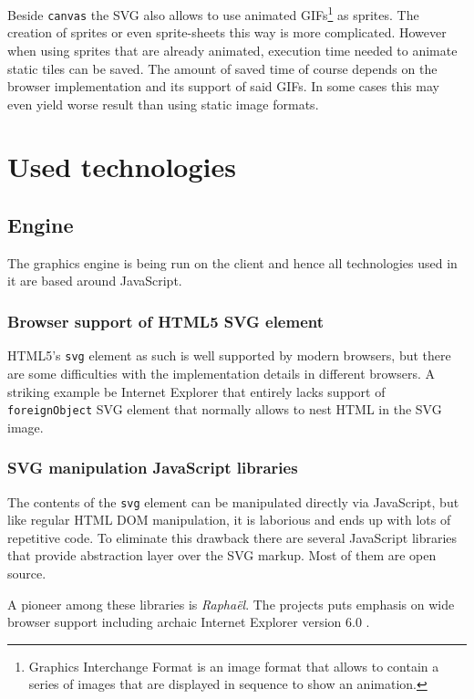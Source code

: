 \documentclass[11pt,oneside, final]{fithesis2}
\begin{document}
Beside \texttt{canvas} the SVG also allows to use animated GIFs\footnote{Graphics Interchange Format is an image format that allows to contain a series of images that are displayed in sequence to show an animation\cite{gifstandard}.} as sprites. The creation of sprites or even sprite-sheets this way is more complicated. However when using sprites that are already animated, execution time needed to animate static tiles can be saved. The amount of saved time of course depends on the browser implementation and its support of said GIFs. In some cases this may even yield worse result than using static image formats.

\chapter{Used technologies}
\label{tech}

\section{Engine}
The graphics engine is being run on the client and hence all technologies used in it are based around JavaScript.

\subsection{Browser support of HTML5 SVG element}
HTML5's \texttt{svg} element as such is well supported by modern browsers\cite{html5svg}, but there are some difficulties with the implementation details in different browsers. A striking example be Internet Explorer that entirely lacks support of \texttt{foreignObject} SVG element that normally allows to nest HTML in the SVG image\cite{ieforeignobject}.

\subsection{SVG manipulation JavaScript libraries}
The contents of the \texttt{svg} element can be manipulated directly via JavaScript, but like regular HTML DOM manipulation, it is laborious and ends up with lots of repetitive code. To eliminate this drawback there are several JavaScript libraries that provide abstraction layer over the SVG markup. Most of them are open source.

A pioneer among these libraries is \emph{Raphaël}. The projects puts emphasis on wide browser support including archaic Internet Explorer version 6.0 \cite{raphael}.
\end{document}
